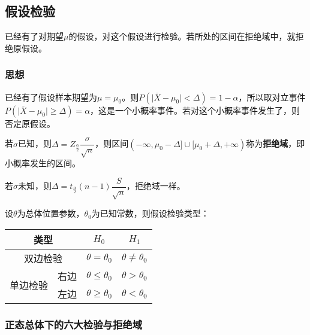 \documentclass[UTF8, 12pt]{ctexart}
\begin{document}
\subsection{假设检验}

已经有了对期望$\mu$的假设，对这个假设进行检验。若所处的区间在拒绝域中，就拒绝原假设。

\subsubsection{思想}

已经有了假设样本期望为$\mu=\mu_0$。则$P(\vert\overline{X}-\mu_0\vert<\Delta)=1-\alpha$，所以取对立事件$P(\vert\overline{X}-\mu_0\vert\geqslant\Delta)=\alpha$，这是一个小概率事件。若对这个小概率事件发生了，则否定原假设。

若$\sigma$已知，则$\Delta=Z_\frac{\alpha}{2}\dfrac{\sigma}{\sqrt{n}}$，则区间$(-\infty,\mu_0-\Delta]\cup[\mu_0+\Delta,+\infty)$称为\textbf{拒绝域}，即小概率发生的区间。

若$\sigma$未知，则$\Delta=t_\frac{\alpha}{2}(n-1)\dfrac{S}{\sqrt{n}}$，拒绝域一样。

设$\theta$为总体位置参数，$\theta_0$为已知常数，则假设检验类型：\medskip

\begin{tabular}{|c|c|c|c|}
    \hline
    \multicolumn{2}{|c|}{类型} & $H_0$ & $H_1$ \\ \hline
    \multicolumn{2}{|c|}{双边检验} & $\theta=\theta_0$ & $\theta\neq\theta_0$ \\ \hline
    \multirow{2}{*}{单边检验} & 右边 & $\theta\leqslant\theta_0$ & $\theta>\theta_0$ \\ \cline{2-4}
    & 左边 & $\theta\geqslant\theta_0$ & $\theta<\theta_0$ \\ \hline
\end{tabular}

\subsubsection{正态总体下的六大检验与拒绝域}
\end{document}
